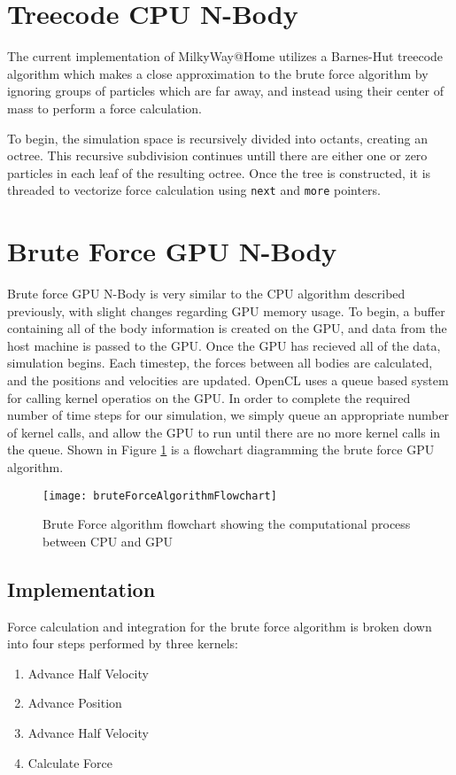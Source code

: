 \documentclass{thesis}
\begin{document}
\section{Treecode CPU N-Body}
The current implementation of MilkyWay@Home utilizes a Barnes-Hut treecode algorithm which makes a close approximation to the brute force algorithm by ignoring groups of particles which are far away, and instead using their center of mass to perform a force calculation.

To begin, the simulation space is recursively divided into octants, creating an octree. This recursive subdivision continues untill there are either one or zero particles in each leaf of the resulting octree. Once the tree is constructed, it is threaded to vectorize force calculation using \texttt{next} and \texttt{more} pointers.
\section{Brute Force GPU N-Body}
Brute force GPU N-Body is very similar to the CPU algorithm described previously, with slight changes regarding GPU memory usage. To begin, a buffer containing all of the body information is created on the GPU, and data from the host machine is passed to the GPU. Once the GPU has recieved all of the data, simulation begins. Each timestep, the forces between all bodies are calculated, and the positions and velocities are updated. OpenCL uses a queue based system for calling kernel operatios on the GPU. In order to complete the required number of time steps for our simulation, we simply queue an appropriate number of kernel calls, and allow the GPU to run until there are no more kernel calls in the queue. Shown in Figure \ref{fig:GPUBruteForceAlg} is a flowchart diagramming the brute force GPU algorithm.

\begin{figure}[h]
    \caption{Brute Force algorithm flowchart showing the computational process between CPU and GPU}
    \label{fig:GPUBruteForceAlg}
    \centering
    \texttt{[image: bruteForceAlgorithmFlowchart]}
\end{figure}

\subsection{Implementation}
Force calculation and integration for the brute force algorithm is broken down into four steps performed by three kernels:
\begin{enumerate}[noitemsep]
    \item Advance Half Velocity
    \item Advance Position
    \item Advance Half Velocity
    \item Calculate Force
\end{enumerate}
\end{document}

